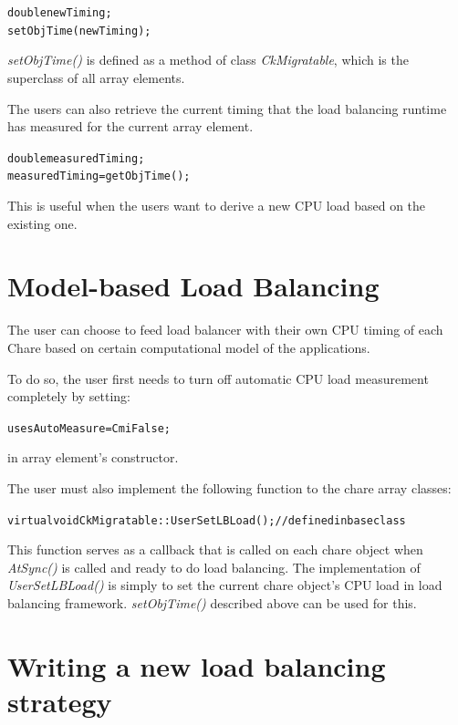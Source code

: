 \begin{alltt}
   double newTiming;
   setObjTime(newTiming);
\end{alltt}

{\em setObjTime()} is defined as a method of class {\em CkMigratable}, which is
the superclass of all array elements.

The users can also retrieve the current timing that the load balancing runtime
has measured for the current array element. 
 
\begin{alltt} 
   double measuredTiming; 
   measuredTiming = getObjTime(); 
\end{alltt}

This is useful when the users want to derive a new CPU load based on the 
existing one.

\section{Model-based Load Balancing}

The user can choose to feed load balancer with their own CPU
timing of each Chare based on certain computational model of the applications.

To do so, the user first needs to turn off automatic CPU load measurement completely
by setting:

\begin{alltt}
   usesAutoMeasure = CmiFalse;
\end{alltt}

in array element's constructor.

The user must also implement the following function to the chare array
classes:

\begin{alltt}
   virtual void CkMigratable::UserSetLBLoad();      // defined in base class
\end{alltt}

This function serves as a callback that is called on each chare object when
{\em AtSync()} is called and ready to do load balancing. The implementation of
{\em UserSetLBLoad()} is simply to set the current chare object's CPU load in
load balancing framework. {\em setObjTime()} described above can be used for
this.

\section{Writing a new load balancing strategy}

